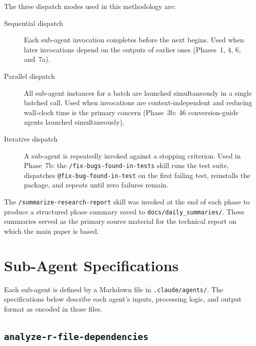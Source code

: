 \documentclass[12pt,a4paper]{article}
\makeatletter
\newcommand{\skill}[1]{\texttt{/#1}}
\newcommand{\agent}[1]{\texttt{@#1}}
\makeatother
\begin{document}
The three dispatch modes used in this methodology are:
\begin{description}
\item[Sequential dispatch] Each sub-agent invocation completes before the next begins. Used when later invocations depend on the outputs of earlier ones (Phases~1, 4, 6, and~7a).
\item[Parallel dispatch] All sub-agent instances for a batch are launched simultaneously in a single batched call. Used when invocations are context-independent and reducing wall-clock time is the primary concern (Phase~3b: 46 conversion-guide agents launched simultaneously).
\item[Iterative dispatch] A sub-agent is repeatedly invoked against a stopping criterion. Used in Phase~7b: the \skill{fix-bugs-found-in-tests} skill runs the test suite, dispatches \agent{fix-bug-found-in-test} on the first failing test, reinstalls the package, and repeats until zero failures remain.
\end{description}

The \skill{summarize-research-report} skill was invoked at the end of each phase to produce a structured phase summary saved to \texttt{docs/daily\_summaries/}. These summaries served as the primary source material for the technical report on which the main paper is based.

\section{Sub-Agent Specifications}
\label{supp:agents}

Each sub-agent is defined by a Markdown file in \texttt{.claude/agents/}. The specifications below describe each agent's inputs, processing logic, and output format as encoded in those files.

\subsection{\texttt{analyze-r-file-dependencies}}
\label{supp:agent-analyze-r}
\end{document}
